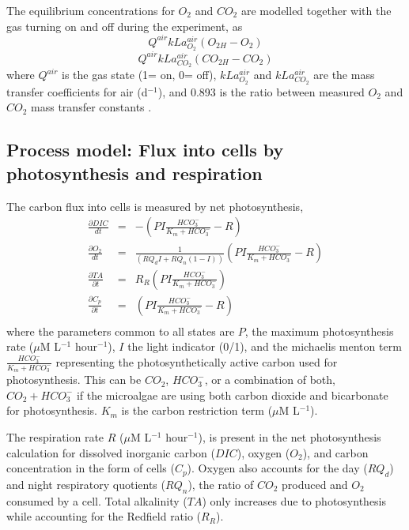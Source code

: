 \documentclass{ruthesis}
\begin{document}
The equilibrium concentrations for $O_2$ and $CO_2$ are modelled together with the gas turning on and off during the experiment, as
\begin{equation}
 Q^{air} kLa_{O_2}^{air} (O_{2H} - O_{2})
\end{equation}
\begin{equation}
 Q^{air} kLa_{CO_2}^{air} (CO_{2H} - CO_{2})
\end{equation}
where $Q^{air}$ is the gas state (1= on, 0= off), $kLa_{O_2}^{air}$ and $kLa_{CO_2}^{air}$ are the mass transfer coefficients for air (d$^{-1}$), and 0.893 is the ratio between measured $O_2$ and $CO_2$ mass transfer constants \cite{grima1993gas}.



\subsection{Process model: Flux into cells by photosynthesis and respiration}

The carbon flux into cells is measured by net photosynthesis,
\begin{align}
\frac{\partial DIC}{dt} &=&  -(P I \frac{HCO_3^-}{K_m + HCO_3^-}  - R) 
\\
\frac{\partial O_2}{dt}	&=&  \frac{1}{(RQ_d I + RQ_n(1-I))}(P I \frac{HCO_3^-}{K_m + HCO_3^-}  - R)
\\
\frac{\partial TA}{\partial t}  &=&      R_R (P I \frac{HCO_3^-}{K_m + HCO_3^-}) \phantom{- R)}
\\
\frac{\partial C_p}{\partial t} &=& 	 (P I \frac{HCO_3^-}{K_m + HCO_3^-} - R) 
\\\nonumber
\end{align} 
where the parameters common to all states are $P$, the maximum photosynthesis rate ($\mu$M L$^{-1}$ hour$^{-1}$), $I$ the light indicator (0/1), and the michaelis menton term $\frac{HCO_3^-}{K_m + HCO_3^-}$ representing the photosynthetically active carbon used for photosynthesis. This can be $CO_2$, $HCO_3^-$, or a combination of both, $CO_2 + HCO_3^-$ if the microalgae are using both carbon dioxide and bicarbonate for photosynthesis. $K_m$ is the carbon restriction term ($\mu$M L$^{-1}$).

The respiration rate $R$ ($\mu$M L$^{-1}$ hour$^{-1}$), is present in the net photosynthesis calculation for dissolved inorganic carbon ($DIC$), oxygen ($O_2$), and carbon concentration in the form of cells ($C_p$). Oxygen also accounts for the day ($RQ_d$) and night respiratory quotients ($RQ_n$), the ratio of $CO_2$ produced and $O_2$ consumed by a cell. 
Total alkalinity ($TA$) only increases due to photosynthesis while accounting for the Redfield ratio ($R_R$).
\end{document}
